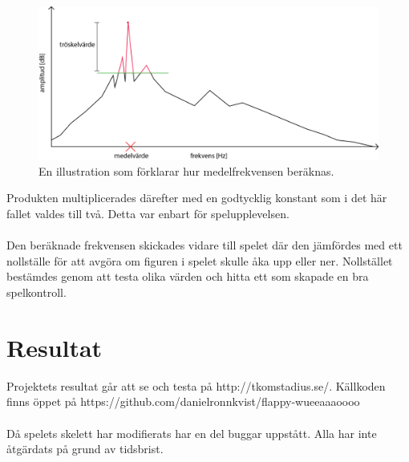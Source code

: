 \documentclass[12pt, titlepage, a4paper]{article}
\begin{document}
      		\renewcommand*\figurename{Bild}
				\begin{figure}[h!]
					\centering
						\includegraphics[width=1\textwidth]{explanation.png}
  							\caption{En illustration som förklarar hur medelfrekvensen beräknas.}
				\end{figure}
			Produkten multiplicerades därefter med en godtycklig konstant som i det här fallet valdes till två. Detta var enbart för spelupplevelsen. 
			\\ \\
			Den beräknade frekvensen skickades vidare till spelet där den jämfördes med ett nollställe för att avgöra om figuren i spelet skulle åka upp eller ner. Nollstället bestämdes genom att testa olika värden och hitta ett som skapade en bra spelkontroll.

	\section{Resultat}

		Projektets resultat går att se och testa på http://tkomstadius.se/. Källkoden finns öppet på  https://github.com/danielronnkvist/flappy-wueeaaaoooo
		\\ \\
		Då spelets skelett har modifierats har en del buggar uppstått. Alla har inte åtgärdats på grund av tidsbrist.
\end{document}
